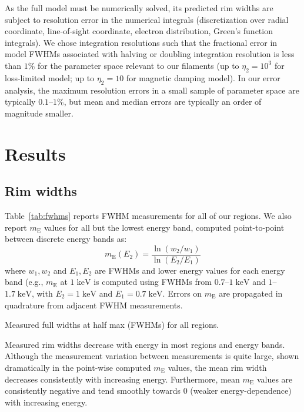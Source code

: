 \documentclass[iop, apj, numberedappendix]{emulateapj}
\newcommand*{\mt}{\mathrm}
\newcommand*{\unit}[1]{\;\mt{#1}}  %
\newcommand*{\mE}{m_\mt{E}}
\begin{document}
As the full model must be numerically solved, its predicted rim widths are
subject to resolution error in the numerical integrals (discretization over
radial coordinate, line-of-sight coordinate, electron distribution, Green's
function integrals).  We chose integration resolutions such that the
fractional error in model FWHMs associated with halving or doubling integration
resolution is less than $1\%$ for the parameter space relevant to our
filaments (up to $\eta_2 = 10^3$ for loss-limited model; up to $\eta_2 = 10$
for magnetic damping model).  In our error analysis, the maximum resolution
errors in a small sample of parameter space are typically $0.1$--$1\%$,
but mean and median errors are typically an order of magnitude smaller.

\section{Results}

\subsection{Rim widths}
\label{sec:fwhm-results}

Table~\ref{tab:fwhms} reports FWHM measurements for all of our regions.
We also report $\mE$ values for all but the lowest energy band, computed
point-to-point between discrete energy bands as:
\begin{equation}
    \mE(E_2) = \frac{\ln(w_2/w_1)}{\ln(E_2/E_1)}
\end{equation}
where $w_1, w_2$ and $E_1, E_2$ are FWHMs and lower energy values for each
energy band (e.g., $\mE$ at $1 \unit{keV}$ is computed using FWHMs from
$0.7$--$1 \unit{keV}$ and $1$--$1.7 \unit{keV}$, with $E_2 = 1
\unit{keV}$ and $E_1 = 0.7 \unit{keV}$.  Errors on $\mE$ are propagated in
quadrature from adjacent FWHM measurements.

\begin{table*}[ht]
    \scriptsize
    \centering
    \caption{Measured full widths at half max (FWHMs) for all regions.
             \label{tab:fwhms}}
    
\end{table*}

Measured rim widths decrease with energy in most regions and energy bands.
Although the measurement variation between measurements is quite large, shown
dramatically in the point-wise computed $\mE$ values, the mean rim width
decreases consistently with increasing energy.  Furthermore, mean $\mE$ values
are consistently negative and tend smoothly towards $0$ (weaker
energy-dependence) with increasing energy.
\end{document}
